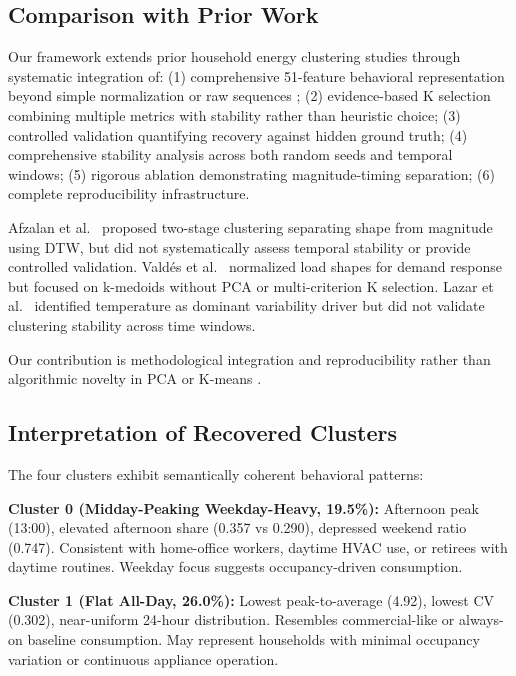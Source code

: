 \subsection{Comparison with Prior Work}

Our framework extends prior household energy clustering studies \cite{kwac2014household,rhodes2014clustering,jin2016loadshape,lazar2021investigating} through systematic integration of: (1) comprehensive 51-feature behavioral representation beyond simple normalization \cite{valdes2021smart} or raw sequences \cite{kwac2014household}; (2) evidence-based K selection combining multiple metrics with stability rather than heuristic choice; (3) controlled validation quantifying recovery against hidden ground truth; (4) comprehensive stability analysis across both random seeds and temporal windows; (5) rigorous ablation demonstrating magnitude-timing separation; (6) complete reproducibility infrastructure.

Afzalan et al.~\cite{afzalan2020twostage} proposed two-stage clustering separating shape from magnitude using DTW, but did not systematically assess temporal stability or provide controlled validation. Vald\'es et al.~\cite{valdes2021smart} normalized load shapes for demand response but focused on k-medoids without PCA or multi-criterion K selection. Lazar et al.~\cite{lazar2021investigating} identified temperature as dominant variability driver but did not validate clustering stability across time windows.

Our contribution is methodological integration and reproducibility rather than algorithmic novelty in PCA \cite{jolliffe2002pca} or K-means \cite{lloyd1982least,arthur2007kmeans}.

\subsection{Interpretation of Recovered Clusters}

The four clusters exhibit semantically coherent behavioral patterns:

\textbf{Cluster 0 (Midday-Peaking Weekday-Heavy, 19.5\%):} Afternoon peak (13:00), elevated afternoon share (0.357 vs 0.290), depressed weekend ratio (0.747). Consistent with home-office workers, daytime HVAC use, or retirees with daytime routines. Weekday focus suggests occupancy-driven consumption.

\textbf{Cluster 1 (Flat All-Day, 26.0\%):} Lowest peak-to-average (4.92), lowest CV (0.302), near-uniform 24-hour distribution. Resembles commercial-like or always-on baseline consumption. May represent households with minimal occupancy variation or continuous appliance operation.

